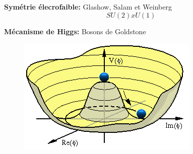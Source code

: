 \documentclass[handout]{beamer}
\begin{document}
\begin{frame}
\textbf{Symétrie élecrofaible:}  Glashow, Salam et Weinberg
  \begin{equation*}
   SU(2)xU(1)
  \end{equation*}

\textbf{Mécanisme de Higgs:} Bosons de Goldstone \\
\begin{figure}[0.3\textwidth]
    \includegraphics[scale=0.4]{higgs.png}
    \end{figure}
\end{frame}
\end{document}
